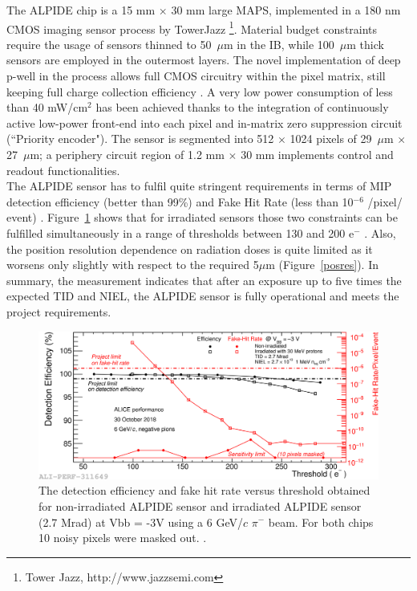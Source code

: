 \noindent The ALPIDE chip is a 15 mm $\times$ 30 mm large MAPS, implemented in a 180 nm CMOS imaging sensor process by TowerJazz \footnote{Tower Jazz, http://www.jazzsemi.com}. Material budget constraints require the usage of sensors thinned to 50~$\mu$m in the IB, while 100~$\mu$m thick sensors are employed in the outermost layers. The novel implementation of deep p-well in the process allows full CMOS circuitry within the pixel matrix, still keeping full charge collection efficiency \cite{Rinella, Suljic}. A very low power consumption of less than 40 mW/cm$^2$ has been achieved thanks to the integration of continuously active low-power front-end into each pixel and in-matrix zero suppression circuit (``Priority encoder"). The sensor is segmented into 512 $\times$ 1024 pixels of 29~$\mu$m $\times$ 27~$\mu$m; a periphery circuit region of 1.2 mm $\times$ 30 mm implements control and readout functionalities.\\
The ALPIDE sensor has to fulfil quite stringent requirements in terms of MIP detection efficiency (better than 99\%) and Fake Hit Rate (less than 10$^{-6}$ /pixel/ event) \cite{ITS-TDR}. Figure~\ref{deteff} shows that for irradiated sensors those two constraints can be fulfilled simultaneously in a range of thresholds between 130 and 200 e$^-$ \cite{Kushpil}. Also, the position resolution dependence on radiation doses is quite limited as it worsens only slightly with respect to the required 5$\mu$m (Figure~\ref{posres}).
In summary, the measurement indicates that after an exposure up to five times the expected TID and NIEL, the ALPIDE sensor is fully operational and meets the project requirements.


\begin{figure}[H]
\centering
\includegraphics[width=1.\linewidth]{figures/SensorSimulation/deteff.png}
\caption{The detection efficiency and fake hit rate versus threshold  obtained for non-irradiated ALPIDE sensor and irradiated ALPIDE sensor (2.7 Mrad) at Vbb = -3V  using a 6 GeV/$c$  $\pi^{-}$ beam. For both chips 10 noisy pixels were masked out. \cite{Kushpil}.}
\label{deteff}
\end{figure}


